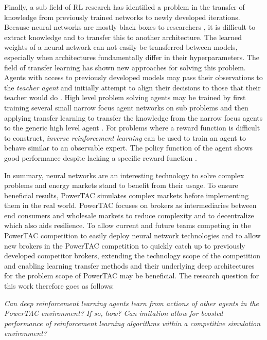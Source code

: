 Finally, a sub field of \ac{RL} research has identified a problem in the transfer of knowledge from previously trained
networks to newly developed iterations. Because neural networks are mostly black boxes to researchers
\cite[]{yosinski2015understanding}, it is difficult to extract knowledge and to transfer this to another architecture. The
learned weights of a neural network can not easily be transferred between models, especially when architectures fundamentally
differ in their hyperparameters. The field of transfer learning has shown new approaches for solving this problem.
Agents with access to previously developed models may pass their observations to the \emph{teacher agent} and initially
attempt to align their decisions to those that their teacher would do \cite[]{schmitt2018kickstarting}. High level 
problem solving agents may be trained by first training several small narrow focus agent networks on sub problems and
then applying transfer learning to transfer the knowledge from the narrow focus agents to the generic high level
agent \cite[]{parisotto2015actor}. For problems where a reward function is difficult to construct, \emph{inverse
reinforcement learning} can be used to train an agent to behave similar to an observable expert. The policy function of
the agent shows good performance despite lacking a specific reward function \cite[]{NG2004Apprentice}.

In summary, neural networks are an interesting technology to solve complex problems and energy markets stand to benefit from
their usage. To ensure beneficial results, \ac{PowerTAC} simulates complex markets before implementing them in the real
world. \ac{PowerTAC} focuses on brokers as intermediaries between end consumers and wholesale markets to reduce
complexity and to decentralize which also aids resilience. To allow current and future teams competing in the \ac{PowerTAC}
competition to easily deploy neural network technologies and to allow new brokers in the \ac{PowerTAC} competition to quickly
catch up to previously developed competitor brokers, extending the technology scope of the competition and enabling
learning transfer methods and their underlying deep architectures for the problem scope of \ac{PowerTAC}
may be beneficial. The research question for this work therefore goes as follows:

\emph{Can deep reinforcement learning agents learn from actions of other agents in the \ac{PowerTAC} environment? If so,
    how? Can imitation allow for boosted performance of reinforcement learning algorithms within a competitive simulation
environment?}



